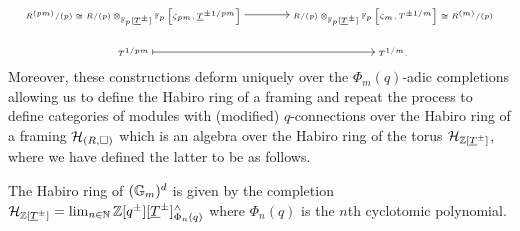 \begin{equation}\label{eqn: gluing map Frobenius}
    \tiny
    \begin{tikzcd}
        {R^{(pm)}/(p)\cong R/(p)\otimes_{\FF_{p}[\underline{T}^{\pm}]}\FF_{p}\left[\zeta_{pm},\underline{T}^{\pm 1/pm}\right]} && {R/(p)\otimes_{\FF_{p}[\underline{T}^{\pm}]}\FF_{p}\left[\zeta_{m},T^{\pm 1/m}\right]\cong R^{(m)}/(p)} \\
        {T^{1/pm}} && {T^{1/m}.}
        \arrow[from=1-1, to=1-3]
        \arrow[maps to, from=2-1, to=2-3]
    \end{tikzcd}
    \normalsize
\end{equation}
Moreover, these constructions deform uniquely over the $\Phi_{m}(q)$-adic completions allowing us to define the Habiro ring of a framing and repeat the process to define categories of modules with (modified) $q$-connections over the Habiro ring of a framing $\mathcal{H}_{(R,\square)}$ which is an algebra over the Habiro ring of the torus $\mathcal{H}_{\mathbb{Z}[\underline{T}^{\pm}]}$, where we have defined the latter to be as follows. 
\begin{definition}\label{def: Habiro ring of base}
    The Habiro ring of $(\mathbb{G}_{m})^{d}$ is given by the completion $\mathcal{H}_{\mathbb{Z}[\underline{T}^{\pm}]}=\lim_{n\in\mathbb{N}}\mathbb{Z}[q^{\pm}][\underline{T}^{\pm}]^{\wedge}_{\Phi_{n}(q)}$ where $\Phi_{n}(q)$ is the $n$th cyclotomic polynomial. 
\end{definition}